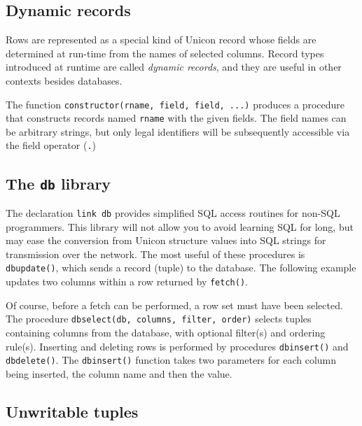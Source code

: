 \subsection{Dynamic records}

Rows are represented as a special kind of Unicon record whose
fields are determined at run-time from the names
of selected columns. Record types introduced at runtime
are called \textit{dynamic records}, and they are useful in other
contexts besides databases.

The function \texttt{constructor(rname, field, field, ...)} produces a
procedure that constructs records named
\texttt{rname} with the given fields. The field names
can be arbitrary strings, but only legal identifiers
will be subsequently accessible via the field operator (\texttt{.})

\subsection{The \texttt{db} library}

The declaration \texttt{link db} provides simplified SQL access routines
for non-SQL programmers.
This library will not allow you to avoid learning SQL for long,
but may ease the conversion from Unicon structure values into SQL
strings for transmission over the network.
The most useful of these procedures is \texttt{dbupdate()}, which sends
a record (tuple) to the database. The following example updates two
columns within a row returned by \texttt{fetch()}.


Of course, before a fetch can be performed, a row set must have been
selected. The procedure \texttt{dbselect(db, columns, filter, order)}
selects tuples containing columns from the database, with optional
filter(s) and ordering rule(s).
Inserting and deleting rows is performed by procedures
\texttt{dbinsert()} and \texttt{dbdelete()}. The \texttt{dbinsert()}
function takes two parameters for each column being inserted, the
column name and then the value.

\subsection{Unwritable tuples}

